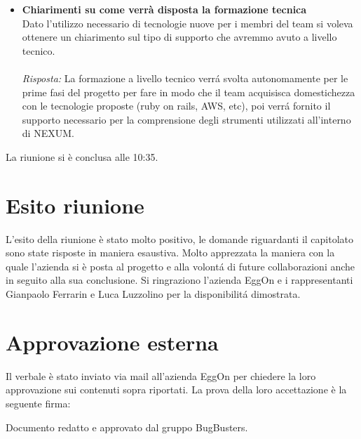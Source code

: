 \documentclass[a4paper,12pt]{article}
\begin{document}
\begin{itemize}
    \item \textbf{Chiarimenti su come verrà disposta la formazione tecnica}\\
    \noindent
    Dato l'utilizzo necessario di tecnologie nuove per i membri del team si voleva ottenere un chiarimento sul tipo di supporto che avremmo avuto a livello tecnico. \\ \\
    \textit{Risposta:} 
    La formazione a livello tecnico verrá svolta autonomamente per le prime fasi del progetto per fare in modo che il team acquisisca domestichezza con le tecnologie proposte (ruby on rails, AWS, etc), poi verrá fornito il supporto necessario per la comprensione degli strumenti utilizzati all'interno di NEXUM. 
    \vspace{1em}

\end{itemize}

La riunione si è conclusa alle 10:35.


\section{Esito riunione}
    L'esito della riunione è stato molto positivo, le domande riguardanti il capitolato sono state risposte in maniera esaustiva. Molto apprezzata la maniera con la quale l'azienda si è posta al progetto e alla volontá di future collaborazioni anche in seguito alla sua conclusione. Si ringraziono l'azienda EggOn e i rappresentanti Gianpaolo Ferrarin e Luca Luzzolino per la disponibilitá dimostrata.
    

\section{Approvazione esterna}
Il verbale è stato inviato via mail all'azienda EggOn per chiedere la loro approvazione sui contenuti sopra riportati. La prova della loro accettazione è la seguente firma:


\vfill
\begin{center}
    {\small\color{darkgray} Documento redatto e approvato dal gruppo BugBusters.}
\end{center}
\end{document}
